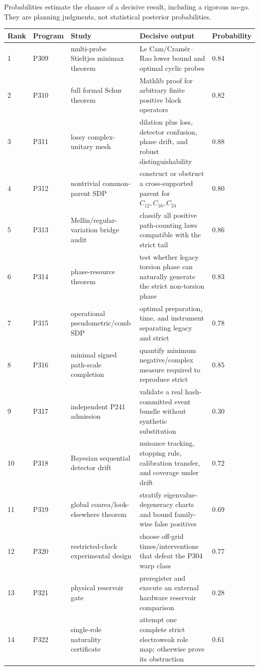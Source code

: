\documentclass[11pt,a4paper,openany]{report}
\begin{document}
Probabilities estimate the chance of a decisive result, including a rigorous no-go. They are planning judgments, not statistical posterior probabilities.

\begin{center}
\begingroup\fontsize{7}{8.4}\selectfont
\setlength{\tabcolsep}{2.5pt}
\renewcommand{\arraystretch}{1.16}
\begin{longtable}{@{}p{}p{}p{}p{}p{}@{}}
\toprule
\textbf{Rank} & \textbf{Program} & \textbf{Study} & \textbf{Decisive output} & \textbf{Probability} \\
\midrule
\endhead
1 & P309 & multi-probe Stieltjes minimax theorem & Le Cam/\allowbreak{}Cramér--Rao lower bound and optimal cyclic probes & 0.84 \\
2 & P310 & full formal Schur theorem & Mathlib proof for arbitrary finite positive block operators & 0.82 \\
3 & P311 & lossy complex-unitary mesh & dilation plus loss, detector confusion, phase drift, and robust distinguishability & 0.88 \\
4 & P312 & nontrivial common-parent SDP & construct or obstruct a cross-supported parent for \(C_{12},C_{16},C_{24}\) & 0.80 \\
5 & P313 & Mellin/\allowbreak{}regular-variation bridge audit & classify all positive path-counting laws compatible with the strict tail & 0.86 \\
6 & P314 & phase-resource theorem & test whether legacy torsion phase can naturally generate the strict non-torsion phase & 0.83 \\
7 & P315 & operational pseudometric/\allowbreak{}comb SDP & optimal preparation, time, and instrument separating legacy and strict & 0.78 \\
8 & P316 & minimal signed path-scale completion & quantify minimum negative/\allowbreak{}complex measure required to reproduce strict & 0.85 \\
9 & P317 & independent P241 admission & validate a real hash-committed event bundle without synthetic substitution & 0.30 \\
10 & P318 & Bayesian sequential detector drift & nuisance tracking, stopping rule, calibration transfer, and coverage under drift & 0.72 \\
11 & P319 & global coarea/\allowbreak{}look-elsewhere theorem & stratify eigenvalue-degeneracy charts and bound family-wise false positives & 0.69 \\
12 & P320 & restricted-clock experimental design & choose off-grid times/\allowbreak{}interventions that defeat the P304 warp class & 0.77 \\
13 & P321 & physical reservoir gate & preregister and execute an external hardware reservoir comparison & 0.28 \\
14 & P322 & single-role naturality certificate & attempt one complete strict electroweak role map; otherwise prove its obstruction & 0.61 \\
\bottomrule
\end{longtable}
\endgroup
\end{center}
\end{document}
